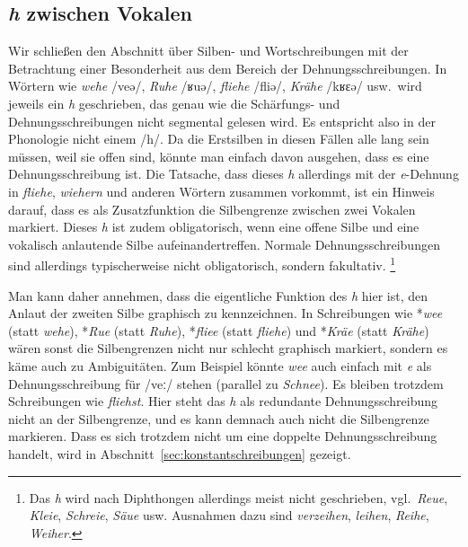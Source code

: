 \subsection{\textit{h} zwischen Vokalen}
\label{sec:hzwischenvokalen}

Wir schließen den Abschnitt über Silben- und Wortschreibungen mit der Betrachtung einer Besonderheit aus dem Bereich der Dehnungsschreibungen.
In Wörtern wie \textit{wehe} /veə/, \textit{Ruhe} /ʁuə/, \textit{fliehe} /fliə/, \textit{Krähe} /kʁɛə/ usw.\ wird jeweils ein \textit{h} geschrieben, das genau wie die Schärfungs- und Dehnungsschreibungen nicht segmental gelesen wird.
Es entspricht also in der Phonologie nicht einem /h/.
Da die Erstsilben in diesen Fällen alle lang sein müssen, weil sie offen sind, könnte man einfach davon ausgehen, dass es eine Dehnungsschreibung ist.
Die Tatsache, dass dieses \textit{h} allerdings mit der \textit{e}-Dehnung in \textit{fliehe}, \textit{wiehern} und anderen Wörtern zusammen vorkommt, ist ein Hinweis darauf, dass es als Zusatzfunktion die Silbengrenze zwischen zwei Vokalen markiert.
Dieses \textit{h} ist zudem obligatorisch, wenn eine offene Silbe und eine vokalisch anlautende Silbe aufeinandertreffen.
Normale Dehnungsschreibungen sind allerdings typischerweise nicht obligatorisch, sondern fakultativ.%
\footnote{Das \textit{h} wird nach Diphthongen allerdings meist nicht geschrieben, vgl.\ \textit{Reue}, \textit{Kleie}, \textit{Schreie}, \textit{Säue} usw.
Ausnahmen dazu sind \zB \textit{verzeihen}, \textit{leihen}, \textit{Reihe}, \textit{Weiher}.}

Man kann daher annehmen, dass die eigentliche Funktion des \textit{h} hier ist, den Anlaut der zweiten Silbe graphisch zu kennzeichnen.
In Schreibungen wie *\textit{wee} (statt \textit{wehe}), *\textit{Rue} (statt \textit{Ruhe}), *\textit{fliee} (statt \textit{fliehe}) und *\textit{Kräe} (statt \textit{Krähe}) wären sonst die Silbengrenzen nicht nur schlecht graphisch markiert, sondern es käme auch zu Ambiguitäten.
Zum Beispiel könnte \textit{wee} auch einfach mit \textit{e} als Dehnungsschreibung für /veː/ stehen (parallel zu \textit{Schnee}).
Es bleiben trotzdem Schreibungen wie \textit{fliehst}.
Hier steht das \textit{h} als redundante Dehnungsschreibung nicht an der Silbengrenze, und es kann demnach auch nicht die Silbengrenze markieren.
Dass es sich trotzdem nicht um eine doppelte Dehnungsschreibung handelt, wird in Abschnitt~\ref{sec:konstantschreibungen} gezeigt.


